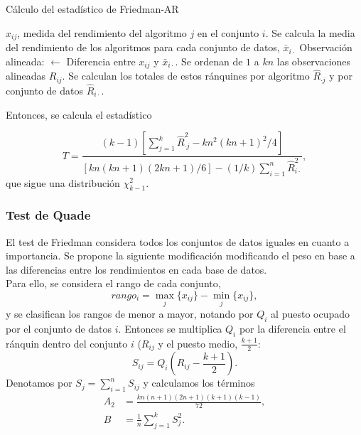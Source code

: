 \begin{algorithm}
	\caption{Cálculo del estadístico de Friedman-AR}
	\label{alg:Friedman-AR}
	\begin{algorithmic}[1]
	\REQUIRE $x_{ij}$, medida del rendimiento del
			algoritmo $j$ en el conjunto $i$.
	\STATE Se calcula la media del rendimiento de los 
		algoritmos para cada conjunto de datos, 
		$\bar{x}_{i \cdot}$
		\STATE Observación alineada: $\leftarrow$
			Diferencia entre $x_{ij}$ y $\bar{x}_{i \cdot}$.	
	\ENDFOR
	\STATE Se ordenan de $1$ a $kn$ las observaciones 
		alineadas $R_{ij}$.
	\STATE Se calculan los totales de estos ránquines
		por algoritmo $\hat{R}_{\cdot j}$ y por
		conjunto de datos $\hat{R}_{i \cdot}$.
	\end{algorithmic}
\end{algorithm} 

	Entonces, se calcula el estadístico 

	\[
		T = \frac{(k-1)
				\left[
					\sum\limits_{j=1}^k
						\hat{R}_{\cdot j}^2 -
					kn^2(kn+1)^2/4
				\right]}
				{[kn(kn+1)(2kn+1)/6] 
				 - (1/k) \sum\limits_{i=1}^n 
				 			\hat{R}_{i \cdot}^2},
	\]
	que sigue una distribución $\chi^2_{k-1}$.
	
\subsubsection{Test de Quade}

	El test de Friedman considera todos los conjuntos de 
datos iguales en cuanto a importancia. Se propone la 
siguiente modificación modificando el peso en base a las
diferencias entre los rendimientos en cada base de datos.\\
	Para ello, se considera el rango de cada conjunto,
	\[ rango_i = \underset{j}{\max} \{x_{ij}\} - 
				 \underset{j}{\min} \{x_{ij}\},
	\]
	y se clasifican los rangos de menor a mayor, notando por 
$Q_i$ al puesto ocupado por el conjunto de datos $i$.
Entonces se multiplica $Q_i$ por la diferencia entre el 
ránquin dentro del conjunto $i$ ($R_{ij}$ y el puesto medio,
$\frac{k+1}{2}$:
	\[ 
		S_{ij} = Q_i 
				\left( R_{ij} - \frac{k+1}{2} \right).
	\]
	Denotamos por $S_j = \sum\limits_{i=1}^n S_{ij}$ y
calculamos los términos
\begin{align*}
		A_2 &= \frac{kn(n+1)(2n+1)(k+1)(k-1)}{72},\\
		B &= \frac{1}{n} \sum\limits_{j=1}^k S_j^2.
\end{align*}

